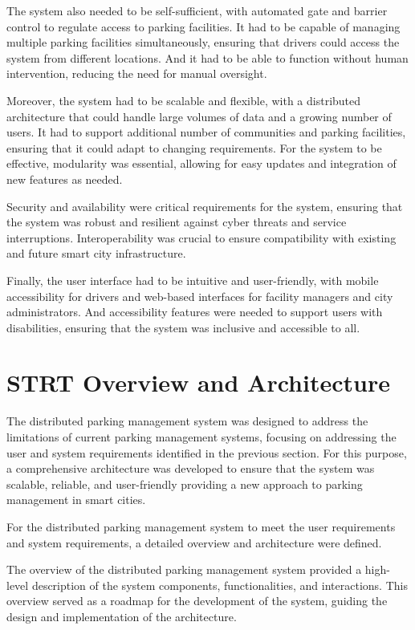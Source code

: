 \documentclass[oneside, 12pt, a4paper, draft]{book}
\begin{document}
The system also needed to be self-sufficient, with automated gate and barrier control to regulate access to parking facilities.
It had to be capable of managing multiple parking facilities simultaneously, ensuring that drivers could access the system from different locations.
And it had to be able to function without human intervention, reducing the need for manual oversight.

Moreover, the system had to be scalable and flexible, with a distributed architecture that could handle large volumes of data and a growing number of users.
It had to support additional number of communities and parking facilities, ensuring that it could adapt to changing requirements.
For the system to be effective, modularity was essential, allowing for easy updates and integration of new features as needed.

Security and availability were critical requirements for the system, ensuring that the system was robust and resilient against cyber threats and service interruptions.
Interoperability was crucial to ensure compatibility with existing and future smart city infrastructure.

Finally, the user interface had to be intuitive and user-friendly, with mobile accessibility for drivers and web-based interfaces for facility managers and city administrators.
And accessibility features were needed to support users with disabilities, ensuring that the system was inclusive and accessible to all.
\chapter{{\bfseries\sffamily STRT} Overview and Architecture}
\label{sec:org499902e}
The distributed parking management system was designed to address the limitations of current parking management systems, focusing on addressing the user and system requirements identified in the previous section.
For this purpose, a comprehensive architecture was developed to ensure that the system was scalable, reliable, and user-friendly providing a new approach to parking management in smart cities.

For the distributed parking management system to meet the user requirements and system requirements, a detailed overview and architecture were defined.

The overview of the distributed parking management system provided a high-level description of the system components, functionalities, and interactions.
This overview served as a roadmap for the development of the system, guiding the design and implementation of the architecture.
\end{document}
